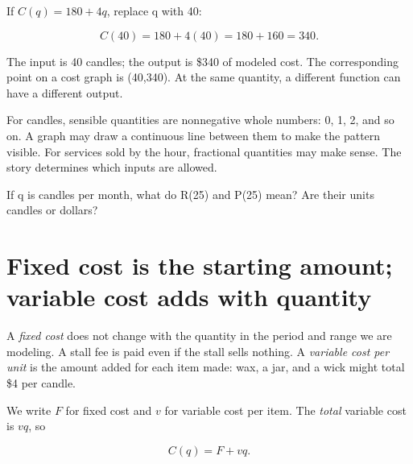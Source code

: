 \documentclass[11pt,letterpaper]{article}
\begin{document}
\begin{tcolorbox}[title={Example \textperiodcentered{} Substitute one choice into the rule},breakable]

If \(C(q)=180+4q\), replace q with 40:


\[C(40)=180+4(40)=180+160=340.\]


The input is 40 candles; the output is \$340 of modeled cost. The corresponding point on a cost graph is (40,340). At the same quantity, a different function can have a different output.


\end{tcolorbox}

For candles, sensible quantities are nonnegative whole numbers: 0, 1, 2, and so on. A graph may draw a continuous line between them to make the pattern visible. For services sold by the hour, fractional quantities may make sense. The story determines which inputs are allowed.



\begin{tcolorbox}[title={Pause and try 1},breakable]
If q is candles per month, what do R(25) and P(25) mean? Are their units candles or dollars?
\end{tcolorbox}

\clearpage

\section{Fixed cost is the starting amount; variable cost adds with quantity}

A \emph{fixed cost} does not change with the quantity in the period and range we are modeling. A stall fee is paid even if the stall sells nothing. A \emph{variable cost per unit} is the amount added for each item made: wax, a jar, and a wick might total \$4 per candle.


We write \(F\) for fixed cost and \(v\) for variable cost per item. The \emph{total} variable cost is \(vq\), so

\[C(q)=F+vq.\]

\par{}\par\medskip
\end{document}
